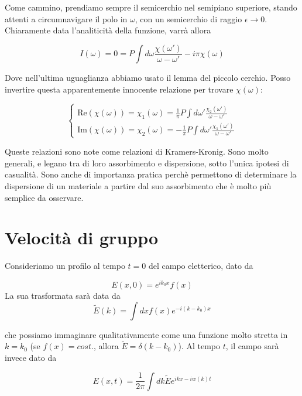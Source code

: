 \documentclass{report}
\begin{document}
Come cammino, prendiamo sempre il semicerchio nel semipiano superiore, stando attenti a circumnavigare il polo in $\omega$, con un semicerchio di raggio $\epsilon \rightarrow 0$. Chiaramente data l'analiticità della funzione, varrà allora 

\begin{equation}
    I(\omega) = 0 = P\int d\omega \frac{\chi(\omega')}{\omega - \omega'} -i\pi \chi(\omega)
\end{equation}

Dove nell'ultima uguaglianza abbiamo usato il lemma del piccolo cerchio. Posso invertire questa apparentemente innocente relazione per trovare \(\chi(\omega)\): 


\begin{tcolorbox}[colback=doc!15, colframe=black, boxrule=1pt]
\[\begin{cases}
    \text{Re}(\chi(\omega)) = \chi_1(\omega) =  \frac{1}{\pi}P\int d\omega' \frac{\chi_2(\omega')}{\omega - \omega'} \\ \text{Im}(\chi(\omega)) = \chi_2(\omega) =-\frac{1}{\pi}P\int d\omega' \frac{\chi_1(\omega')}{\omega - \omega'}
\end{cases}\]
\end{tcolorbox}

Queste relazioni sono note come relazioni di Kramers-Kronig. Sono molto generali, e legano tra di loro assorbimento e dispersione, sotto l'unica ipotesi di casualità. Sono anche di importanza pratica perchè permettono di determinare la dispersione di un materiale a partire dal suo assorbimento che è molto più semplice da osservare. 

\section{Velocità di gruppo}
Consideriamo un profilo al tempo $t=0$ del campo eletterico, dato da 

\begin{equation}
    E(x, 0) = e^{ik_0x}f(x)
\end{equation}
La sua trasformata sarà data da 
\begin{equation}
    \tilde{E}(k) = \int dx f(x)e^{-i(k-k_0)x}
\end{equation}

che possiamo immaginare qualitativamente come una funzione molto stretta in $k =k_0$ (se $f(x) = cost.$, allora $\tilde{E} = \delta(k-k_0)$). Al tempo $t$, il campo sarà invece dato da 

\begin{equation}
    E(x, t) = \frac{1}{2\pi}\int dk \tilde{E}e^{ikx - iw(k)t}
\end{equation}
\end{document}
